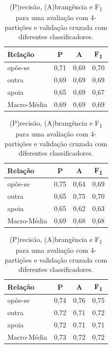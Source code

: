 \documentclass[a4paper, twocolumn, 11pt, twoside]{article}
\begin{document}
\begin{table}
    \begin{subtable}[c]{.5\textwidth}
    \centering
    \begin{tabular}{l ccc}
        {\bf Relação} & {\bf P} & {\bf A} & {\bf F\textsubscript{1}} \\
		\hline
        opõe-se          &  0,71  &  0,69  &  0,70   \\
        outra            &  0,69  &  0,69  &  0,69   \\
        apoia            &  0,65  &  0,69  &  0,67   \\
		\hline
		Macro-Média      &	0,69  &  0,69  &  0,69   \\
    \end{tabular}
    \caption{SVM com um kernel linear.\label{tbl:svmlinearaccuracy}}
    \vspace{5mm}           
    \end{subtable}
\quad%
    \begin{subtable}[c]{.5\textwidth}
    \centering
    \begin{tabular}{l ccc}
        {\bf Relação} & {\bf P} & {\bf A} & {\bf F\textsubscript{1}} \\
		\hline
        opõe-se          &  0,75  &  0,64  &  0,69   \\
        outra            &  0,65  &  0,75  &  0,70   \\
        apoia            &  0,65  &  0,62  &  0,63   \\
		\hline
		Macro-Média      &  0,69  &  0,68  &  0,68   \\
    \end{tabular}
    \caption{LSTM bidireccional.\label{tbl:bilstm}}
    \vspace{5mm}     
    \end{subtable}
\quad%
    \begin{subtable}[c]{.5\textwidth}
    \centering
    \begin{tabular}{l ccc}
        {\bf Relação} & {\bf P} & {\bf A} & {\bf F\textsubscript{1}} \\
		\hline
        opõe-se          &  0,74  &  0,76  &  0,75   \\
        outra            &  0,72  &  0,71  &  0,72   \\
        apoia            &  0,72  &  0,71  &  0,71   \\
		\hline
		Macro-Média      &  0,73  &  0,72  &  0,72   \\
    \end{tabular}
    \caption{DistilBERT pré-treinado em Português.\label{tbl:distilbert}}
    \end{subtable}
  \caption{(P)recisão, (A)brangência e F\textsubscript{1} para uma avaliação com 4-partições e validação cruzada com diferentes classificadores.}
  \label{tab:results_relacao}
\end{table}
\end{document}
